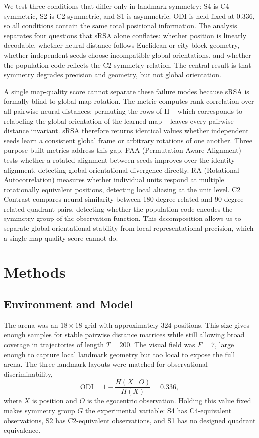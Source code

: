 ﻿\documentclass[10pt]{article}
\begin{document}
We test three conditions that differ only in landmark symmetry: S4 is C4-symmetric, S2 is C2-symmetric, and S1 is asymmetric. ODI is held fixed at 0.336, so all conditions contain the same total positional information. The analysis separates four questions that sRSA alone conflates: whether position is linearly decodable, whether neural distance follows Euclidean or city-block geometry, whether independent seeds choose incompatible global orientations, and whether the population code reflects the C2 symmetry relation. The central result is that symmetry degrades precision and geometry, but not global orientation.

A single map-quality score cannot separate these failure modes because sRSA is formally blind to global map rotation. The metric computes rank correlation over all pairwise neural distances; permuting the rows of H -- which corresponds to relabeling the global orientation of the learned map -- leaves every pairwise distance invariant. sRSA therefore returns identical values whether independent seeds learn a consistent global frame or arbitrary rotations of one another. Three purpose-built metrics address this gap. PAA (Permutation-Aware Alignment) tests whether a rotated alignment between seeds improves over the identity alignment, detecting global orientational divergence directly. RA (Rotational Autocorrelation) measures whether individual units respond at multiple rotationally equivalent positions, detecting local aliasing at the unit level. C2 Contrast compares neural similarity between 180-degree-related and 90-degree-related quadrant pairs, detecting whether the population code encodes the symmetry group of the observation function. This decomposition allows us to separate global orientational stability from local representational precision, which a single map quality score cannot do.

\section{Methods}

\subsection{Environment and Model}

The arena was an $18\times18$ grid with approximately 324 positions. This size gives enough samples for stable pairwise distance matrices while still allowing broad coverage in trajectories of length $T=200$. The visual field was $F=7$, large enough to capture local landmark geometry but too local to expose the full arena. The three landmark layouts were matched for observational discriminability,
\[
\mathrm{ODI}=1-\frac{H(X\mid O)}{H(X)}=0.336,
\]
where $X$ is position and $O$ is the egocentric observation. Holding this value fixed makes symmetry group $G$ the experimental variable: S4 has C4-equivalent observations, S2 has C2-equivalent observations, and S1 has no designed quadrant equivalence.
\end{document}
